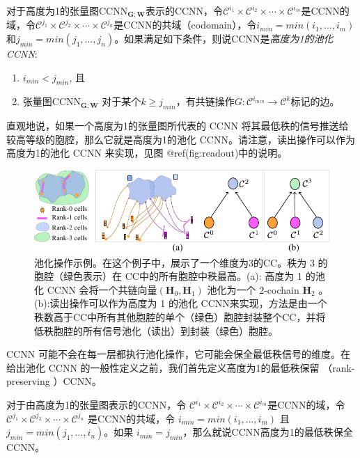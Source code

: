 \documentclass[
  12pt,
]{krantz}
\providecommand{\tightlist}{%
  \setlength{\itemsep}{0pt}\setlength{\parskip}{0pt}}
\begin{document}
\label{height-1-pooling}
对于高度为1的张量图\(\mbox{CCNN}_{\mathbf{G};\mathbf{W}}\)表示的CCNN，令\(\mathcal{C}^{i_1}\times\mathcal{C}^{i_2}\times \cdots \times  \mathcal{C}^{i_m}\)是CCNN的域，令\(\mathcal{C}^{j_1}\times\mathcal{C}^{j_2}\times \cdots \times \mathcal{C}^{j_n}\)是CCNN的共域（codomain），令\(i_{min}=min(i_1,\ldots,i_m)\)和\(j_{min}=min(j_1,\ldots,j_n)\)。如果满足如下条件，则说CCNN是\emph{高度为1的池化CCNN}:

\begin{enumerate}
\def\labelenumi{\arabic{enumi}.}
\tightlist
\item
  \(i_{min}< j_{min}\), 且
\item
  张量图\(\mbox{CCNN}_{\mathbf{G};\mathbf{W}}\)
  对于某个\(k\geq j_{min}\)，有共链操作\(G\colon \mathcal{C}^{i_{min}} \to \mathcal{C}^{k}\)标记的边。
\end{enumerate}

直观地说，如果一个高度为1的张量图所代表的 CCNN
将其最低秩的信号推送给较高等级的胞腔，那么它就是高度为1的池化
CCNN。请注意，读出操作可以作为高度为1的池化 CCNN 来实现，见图
@ref(fig:readout)中的说明。

\begin{figure}

{\centering \includegraphics{figures/read_out} 

}

\caption{池化操作示例。在这个例子中，展示了一个维度为3的CC。秩为 3 的胞腔（绿色表示）在 CC中的所有胞腔中秩最高。(a): 高度为 1 的池化 CCNN 会将一个共链向量$(\mathbf{H}_0,\mathbf{H}_1)$ 池化为一个 2-cochain $\mathbf{H}_2$ 。 (b):读出操作可以作为高度为 1 的池化 CCNN来实现，方法是由一个秩数高于CC中所有其他胞腔的单个（绿色）胞腔封装整个CC，并将低秩胞腔的所有信号池化（读出）到封装（绿色）胞腔。}\label{fig:readout}
\end{figure}

CCNN
可能不会在每一层都执行池化操作，它可能会保全最低秩信号的维度。在给出池化
CCNN 的一般性定义之前，我们首先定义高度为1的最低秩保留 （rank-preserving
）CCNN。

\label{lowest-rank}
对于由高度为1的张量图表示的CCNN，令
\(\mathcal{C}^{i_1}\times\mathcal{C}^{i_2}\times \cdots \times  \mathcal{C}^{i_m}\)是CCNN的域，令
\(\mathcal{C}^{j_1}\times\mathcal{C}^{j_2}\times \cdots \times \mathcal{C}^{j_n}\)
是CCNN的共域，令 \(i_{min}=min(i_1,\ldots,i_m)\)
且\(j_{min}=min(j_1,\ldots,i_n)\)。如果
\(i_{min}= j_{min}\)，那么就说CCNN高度为1的最低秩保全CCNN。
\end{document}
